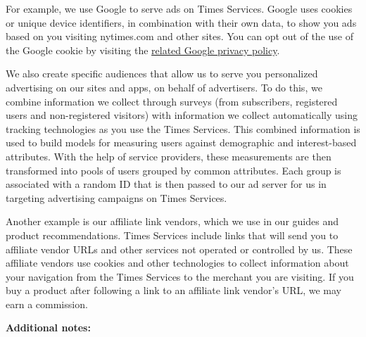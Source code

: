 For example, we use Google to serve ads on Times Services. Google uses
cookies or unique device identifiers, in combination with their own
data, to show you ads based on you visiting nytimes.com and other sites.
You can opt out of the use of the Google cookie by visiting the
\href{https://policies.google.com/technologies/ads?hl=en}{related Google
privacy policy}.

We also create specific audiences that allow us to serve you
personalized advertising on our sites and apps, on behalf of
advertisers. To do this, we combine information we collect through
surveys (from subscribers, registered users and non-registered visitors)
with information we collect automatically using tracking technologies as
you use the Times Services. This combined information is used to build
models for measuring users against demographic and interest-based
attributes. With the help of service providers, these measurements are
then transformed into pools of users grouped by common attributes. Each
group is associated with a random ID that is then passed to our ad
server for us in targeting advertising campaigns on Times Services.

Another example is our affiliate link vendors, which we use in our
guides and product recommendations. Times Services include links that
will send you to affiliate vendor URLs and other services not operated
or controlled by us. These affiliate vendors use cookies and other
technologies to collect information about your navigation from the Times
Services to the merchant you are visiting. If you buy a product after
following a link to an affiliate link vendor's URL, we may earn a
commission.

\textbf{Additional notes:}

